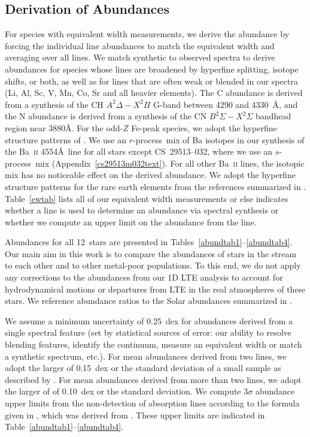 \documentclass{emulateapj}
\def\rpro{\mbox{$r$-process}}
\def\spro{\mbox{$s$-process}}
\begin{document}
\subsection{Derivation of Abundances}


For species with equivalent width measurements, we derive the
abundance by forcing the individual line abundances to match
the equivalent width and averaging over all lines.
We match synthetic to observed spectra to derive abundances for
species whose lines
are broadened by hyperfine splitting, isotope shifts, or both,
as well as for lines that are often weak or blended in our spectra
(Li, Al, Sc, V, Mn, Co, Sr and all heavier elements).
The C abundance is derived from a synthesis of the CH 
$A^2\Delta - X^2\Pi$ G-band 
between 4290 and 4330~\AA, and the
N abundance is derived from a synthesis of the CN 
$B^2\Sigma - X^2\Sigma$ %
bandhead region near 3880\AA.
For the odd-$Z$ Fe-peak species, we adopt the hyperfine
structure patterns of \citet{kurucz95}.
We use an \rpro\ mix of Ba isotopes in our synthesis of the Ba~\textsc{ii}
4554\AA\ line for all stars except \mbox{CS~29513--032}, where we use
an \spro\ mix (Appendix~\ref{cs29513m032text}).
For all other Ba~\textsc{ii} lines, the isotopic mix has
no noticeable effect on the derived abundance.
We adopt the hyperfine structure patterns for the rare earth elements 
from the references summarized in \citet{lawler09}.
Table~\ref{ewtab} lists all of our equivalent width measurements or else
indicates whether a line is used to determine an abundance via
spectral synthesis or whether we compute an upper limit on the abundance
from the line.

Abundances for all 12~stars are presented in 
Tables~\ref{abundtab1}--\ref{abundtab4}.
Our main aim in this work is to compare the abundances of stars
in the stream to each other and to other metal-poor populations.
To this end, we do not apply any corrections to the abundances
from our 1D LTE analysis to account for hydrodynamical motions
or departures from LTE in the real atmospheres of these stars.
We reference abundance ratios to the Solar abundances
summarized in \citet{asplund09}.

We assume a minimum uncertainty of 0.25~dex for abundances derived
from a single spectral feature 
(set by statistical sources of error: 
our ability to resolve blending features, 
identify the continuum, measure an equivalent
width or match a synthetic spectrum, etc.).
For mean abundances derived from two lines, 
we adopt the larger of 0.15~dex or
the standard deviation of a small sample as described by \citet{keeping62}.
For mean abundances derived from more than two lines,
we adopt the larger of of 0.10~dex or the standard deviation.
We compute 3$\sigma$ abundance upper limits from the non-detection of
absorption lines according to the formula given in \citet{frebel08}, 
which was derived from \citet{bohlin83}.
These upper limits are indicated in Table~\ref{abundtab1}--\ref{abundtab4}.
\end{document}
